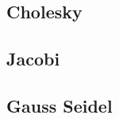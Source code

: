 \documentclass[a4paper]{article}
\begin{document}

\begin{appendix}
  \section*{Cholesky}
  
\end{appendix}
\clearpage


\begin{appendix}
  \section*{Jacobi}
  
\end{appendix}
\clearpage


\begin{appendix}
  \section*{Gauss Seidel}
    
\end{appendix}
\end{document}
